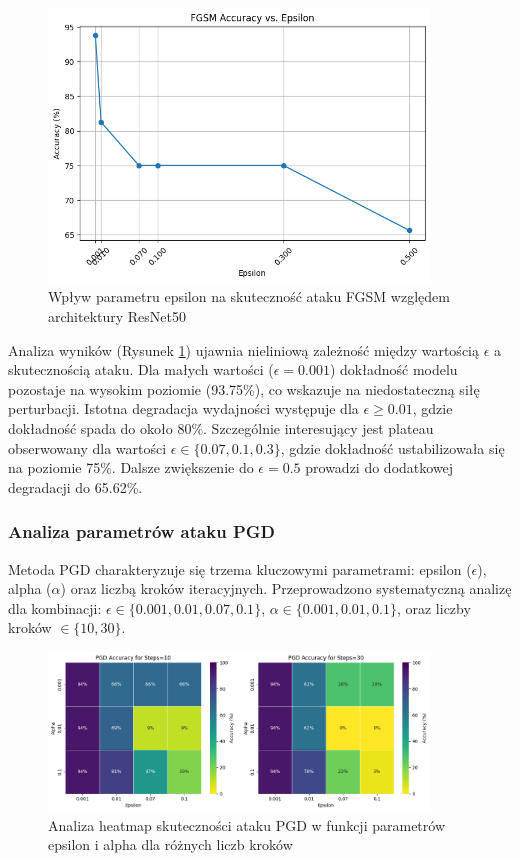 \documentclass[12pt]{article}
\begin{document}
\begin{figure}[H]
    \centering
    \includegraphics[width=0.9\textwidth]{fgsm_epsilon_impact.png}
    \caption{Wpływ parametru epsilon na skuteczność ataku FGSM względem architektury ResNet50}
    \label{fig:fgsm-epsilon}
\end{figure}

Analiza wyników (Rysunek \ref{fig:fgsm-epsilon}) ujawnia nieliniową zależność między wartością $\epsilon$ a skutecznością ataku. Dla małych wartości ($\epsilon = 0.001$) dokładność modelu pozostaje na wysokim poziomie (93.75\%), co wskazuje na niedostateczną siłę perturbacji. Istotna degradacja wydajności występuje dla $\epsilon \geq 0.01$, gdzie dokładność spada do około 80\%. Szczególnie interesujący jest plateau obserwowany dla wartości $\epsilon \in \{0.07, 0.1, 0.3\}$, gdzie dokładność ustabilizowała się na poziomie 75\%. Dalsze zwiększenie do $\epsilon = 0.5$ prowadzi do dodatkowej degradacji do 65.62\%.

\subsubsection{Analiza parametrów ataku PGD}

Metoda PGD charakteryzuje się trzema kluczowymi parametrami: epsilon ($\epsilon$), alpha ($\alpha$) oraz liczbą kroków iteracyjnych. Przeprowadzono systematyczną analizę dla kombinacji: $\epsilon \in \{0.001, 0.01, 0.07, 0.1\}$, $\alpha \in \{0.001, 0.01, 0.1\}$, oraz liczby kroków $\in \{10, 30\}$.

\begin{figure}[H]
    \centering
    \includegraphics[width=0.9\textwidth]{pgd_heatmap.png}
    \caption{Analiza heatmap skuteczności ataku PGD w funkcji parametrów epsilon i alpha dla różnych liczb kroków}
    \label{fig:pgd-heatmap}
\end{figure}
\end{document}
